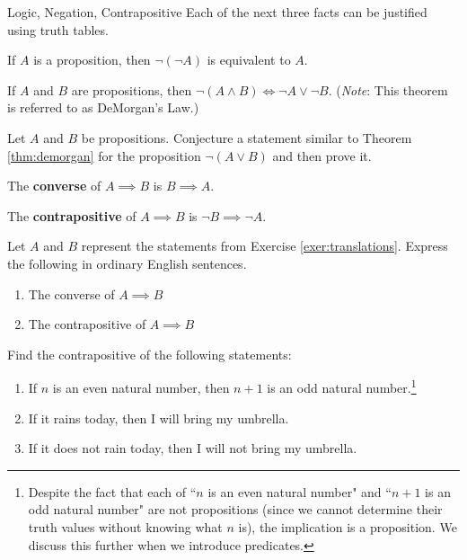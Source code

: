 \begin{section}{Logic, Negation, Contrapositive}
Each of the next three facts can be justified using truth tables.

\begin{theorem}
If $A$ is a proposition, then $\neg(\neg A)$ is equivalent to $A$.
\end{theorem}

\begin{theorem}\label{thm:demorgan}
If $A$ and $B$ are propositions, then $\neg(A \wedge B) \iff \neg A \vee \neg B$.  (\emph{Note}: This theorem is referred to as DeMorgan's Law.)
\end{theorem}

\begin{problem}[*]
Let $A$ and $B$ be propositions.  Conjecture a statement similar to Theorem \ref{thm:demorgan} for the proposition $\neg(A\vee B)$ and then prove it.
\end{problem}

\begin{definition}
The \textbf{converse} of $A \implies B$ is $B \implies A$.
\end{definition}

\begin{definition}
The \textbf{contrapositive} of $A \implies B$ is $\neg B \implies \neg A$.
\end{definition}

\begin{exercise}
Let $A$ and $B$ represent the statements from Exercise \ref{exer:translations}.  Express the following in ordinary English sentences.
\begin{enumerate}
\item The converse of $A \implies B$
\item The contrapositive of $A \implies B$
\end{enumerate}
\end{exercise}

\begin{exercise} Find the contrapositive of the following statements: 
\begin{enumerate}
\item If $n$ is an even natural number, then $n+1$ is an odd natural number.\footnote{Despite the fact that each of ``$n$ is an even natural number" and ``$n+1$ is an odd natural number" are not propositions (since we cannot determine their truth values without knowing what $n$ is), the implication is a proposition.  We discuss this further when we introduce predicates.}
\item If it rains today, then I will bring my umbrella.
\item If it does not rain today, then I will not bring my umbrella.
\end{enumerate} \end{exercise}


\end{section}
